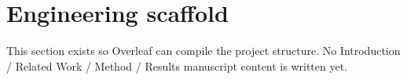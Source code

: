 \section{Engineering scaffold}
This section exists so Overleaf can compile the project structure.
No Introduction / Related Work / Method / Results manuscript content is written yet.
